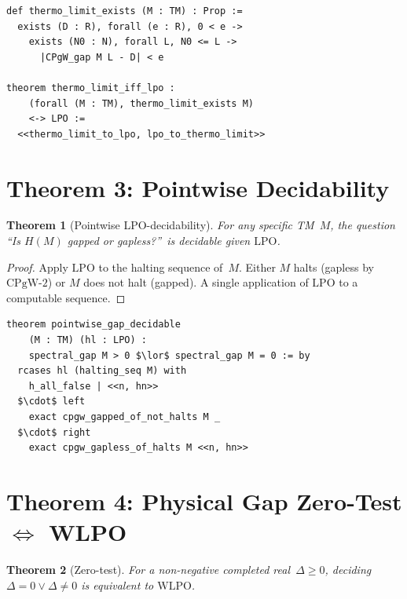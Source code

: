 \documentclass[11pt,a4paper]{article}
\theoremstyle{plain}
\newtheorem{theorem}{Theorem}[section]
\theoremstyle{definition}
\newcommand{\LPO}{\ensuremath{\mathrm{LPO}}}
\newcommand{\WLPO}{\ensuremath{\mathrm{WLPO}}}
\newcommand{\CPgW}{\ensuremath{\mathrm{CPgW}}}
\begin{document}
\begin{lstlisting}[caption={Theorem 2: thermodynamic limit $\leftrightarrow$ LPO (ThermoLimit.lean)}]
def thermo_limit_exists (M : TM) : Prop :=
  exists (D : R), forall (e : R), 0 < e ->
    exists (N0 : N), forall L, N0 <= L ->
      |CPgW_gap M L - D| < e

theorem thermo_limit_iff_lpo :
    (forall (M : TM), thermo_limit_exists M)
    <-> LPO :=
  <<thermo_limit_to_lpo, lpo_to_thermo_limit>>
\end{lstlisting}

\section{Theorem 3: Pointwise Decidability}\label{sec:thm3}

\begin{theorem}[Pointwise LPO-decidability]\label{thm:pointwise}
For any specific TM~$M$, the question ``Is $H(M)$ gapped or
gapless?''\ is decidable given $\LPO$.
\end{theorem}

\begin{proof}
Apply $\LPO$ to the halting sequence of~$M$. Either $M$ halts
(gapless by $\CPgW\text{-}2$) or $M$ does not halt (gapped).
A single application of $\LPO$ to a computable sequence.
\end{proof}

\begin{lstlisting}[caption={Theorem 3: pointwise decidability (Pointwise.lean)}]
theorem pointwise_gap_decidable
    (M : TM) (hl : LPO) :
    spectral_gap M > 0 $\lor$ spectral_gap M = 0 := by
  rcases hl (halting_seq M) with
    h_all_false | <<n, hn>>
  $\cdot$ left
    exact cpgw_gapped_of_not_halts M _
  $\cdot$ right
    exact cpgw_gapless_of_halts M <<n, hn>>
\end{lstlisting}

\section{Theorem 4: Physical Gap Zero-Test $\Leftrightarrow$ WLPO}%
\label{sec:thm4}

\begin{theorem}[Zero-test]\label{thm:zero}
For a non-negative completed real~$\Delta \geq 0$, deciding
$\Delta = 0 \lor \Delta \neq 0$ is equivalent to $\WLPO$.
\end{theorem}
\end{document}
